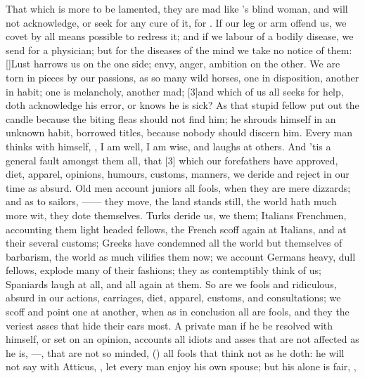 {That which is more to be lamented, they are mad like \Seneca's blind
woman, and will not acknowledge, or seek for any cure of it, for
. If our leg or arm offend us, we
covet by all means possible to redress it; and if we labour of a
bodily disease, we send for a physician; but for the diseases of the
mind we take no notice of them: [\baselineskip]Lust harrows us on the one side;
envy, anger, ambition on the other. We are torn in pieces by our
passions, as so many wild horses, one in disposition, another in habit;
one is melancholy, another mad; [3\baselineskip]and which of us all seeks for
help, doth acknowledge his error, or knows he is sick? As that stupid
fellow put out the candle because the biting fleas should not find him;
he shrouds himself in an unknown habit, borrowed titles, because nobody
should discern him. Every man thinks with himself, , I am well, I am wise, and laughs at others. And 'tis a general
fault amongst them all, that [3\baselineskip] which our forefathers have approved,
diet, apparel, opinions, humours, customs, manners, we deride and
reject in our time as absurd. Old men account juniors all fools, when
they are mere dizzards; and as to sailors, ------ they move, the land stands still, the world hath much more
wit, they dote themselves. Turks deride us, we them; Italians
Frenchmen, accounting them light headed fellows, the French scoff again
at Italians, and at their several customs; Greeks have condemned all
the world but themselves of barbarism, the world as much vilifies them
now; we account Germans heavy, dull fellows, explode many of their
fashions; they as contemptibly think of us; Spaniards laugh at all, and
all again at them. So are we fools and ridiculous, absurd in our
actions, carriages, diet, apparel, customs, and consultations; we 
scoff and point one at another, when as in conclusion all are fools,
 and they the veriest asses that hide their ears most. A private
man if he be resolved with himself, or set on an opinion, accounts all
idiots and asses that are not affected as he is, ---, that are not so minded, () all fools that think not as he
doth: he will not say with Atticus, ,
let every man enjoy his own spouse; but his alone is fair, ,
}
